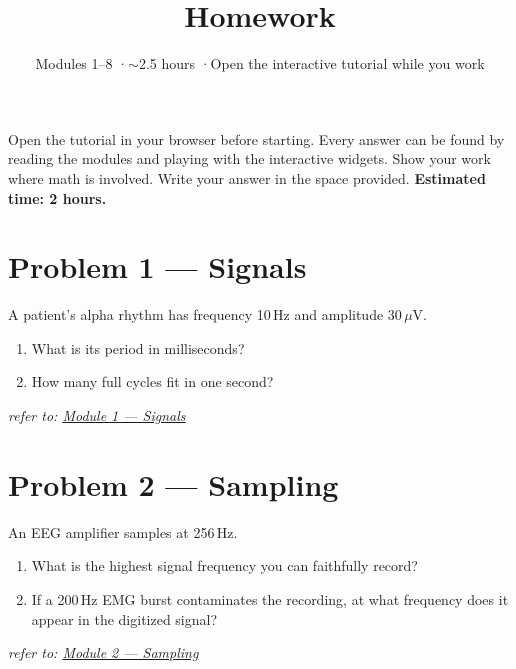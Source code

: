 \documentclass[11pt,letterpaper]{article}
\title{\color{accent}Homework}
\author{}
\date{Modules 1--8 \quad·\quad ${\sim}$2.5 hours \quad·\quad Open the interactive tutorial while you work}
\begin{document}
\maketitle
\thispagestyle{empty}

\begin{tcolorbox}[colback=accent!5,colframe=accent,boxrule=0.6pt,arc=4pt,
  left=10pt,right=10pt,top=8pt,bottom=8pt]
Open the tutorial in your browser before starting. Every answer can be found by
reading the modules and playing with the interactive widgets. Show your work
where math is involved. Write your answer in the space provided.
\textbf{Estimated time: 2 hours.}
\end{tcolorbox}

\vspace{1em}

\section*{Problem 1 — Signals}
A patient's alpha rhythm has frequency 10\,Hz and amplitude 30\,$\mu$V.
\begin{enumerate}[label=(\alph*),leftmargin=*]
\item What is its period in milliseconds?
\item How many full cycles fit in one second?
\end{enumerate}

\vspace{3.5cm}
\hfill\textit{\small refer to: \href{https://judepj.github.io/neuro-signals-101/modules/01_signals.html}{Module 1 — Signals}}

\vfill\pagebreak

\section*{Problem 2 — Sampling}
An EEG amplifier samples at 256\,Hz.
\begin{enumerate}[label=(\alph*),leftmargin=*]
\item What is the highest signal frequency you can faithfully record?
\item If a 200\,Hz EMG burst contaminates the recording, at what frequency does it appear in the digitized signal?
\end{enumerate}

\vspace{4cm}
\hfill\textit{\small refer to: \href{https://judepj.github.io/neuro-signals-101/modules/02_sampling.html}{Module 2 — Sampling}}
\end{document}
